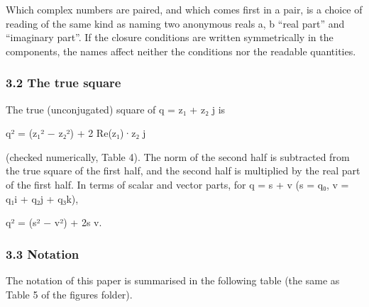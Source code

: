 \documentclass[
  a4paper,
]{article}
\begin{document}
Which complex numbers are paired, and which comes first in a pair, is a
choice of reading of the same kind as naming two anonymous reals a, b
``real part'' and ``imaginary part''. If the closure conditions are
written symmetrically in the components, the names affect neither the
conditions nor the readable quantities.

\subsubsection{3.2 The true square}\label{the-true-square}

The true (unconjugated) square of q = z₁ + z₂ j is

q² = (z₁² − \textbar z₂\textbar²) + 2 Re(z₁)·z₂ j

(checked numerically, Table 4). The norm of the second half is
subtracted from the true square of the first half, and the second half
is multiplied by the real part of the first half. In terms of scalar and
vector parts, for q = s + v (s = q₀, v = q₁i + q₂j + q₃k),

q² = (s² − \textbar v\textbar²) + 2s v.

\subsubsection{3.3 Notation}\label{notation}

The notation of this paper is summarised in the following table (the
same as Table 5 of the figures folder).
\end{document}
